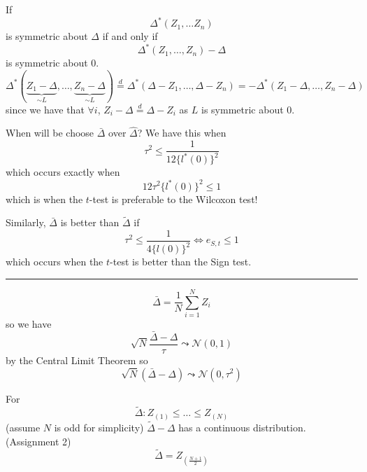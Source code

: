 \documentclass[a4paper,12pt]{amsart}
\newcommand{\sumiN}{\sum_{i=1}^N}
\begin{document}
If \[\Delta^*(Z_1, \ldots Z_n)\]
is symmetric about $\Delta$ if and only if
\[\Delta^*(Z_1, \ldots, Z_n) - \Delta \]
is symmetric about 0. 
\[\Delta^*(\underbrace{Z_1 - \Delta}_{\sim L}, \ldots, \underbrace{Z_n - \Delta}_{\sim L}) \overset{d}{=} \Delta^*(\Delta - Z_1, \ldots, \Delta - Z_n) =  - \Delta^*(Z_1 - \Delta, \ldots, Z_n - \Delta)\]
since we have that $\forall i$, $Z_i - \Delta \overset{d}{=} \Delta - Z_i$ as $L$ is symmetric about 0.

When will be choose $\bar{\Delta}$ over $\widehat{\Delta}$?
We have this when 
\[\tau^2 \leq \frac{1}{12 \{l^*(0)\}^2}\]
which occurs exactly when 
\[12 \tau^2 \{l^*(0)\}^2 \leq 1\]
which is when the $t$-test is preferable to the Wilcoxon test!


Similarly, $\bar{\Delta}$ is better than $\tilde{\Delta}$ if
\[\tau^2 \leq \frac{1}{4 \{l(0)\}^2} \Leftrightarrow e_{S,t} \leq 1\]
which occurs when the $t$-test is better than the Sign test.

\bigskip \hrule \bigskip

\[\bar{\Delta} = \frac{1}{N}\sumiN Z_i\]
so we have
\[\sqrt{N} \frac{\bar{\Delta} - \Delta}{\tau} \leadsto \mathcal{N}(0,1)\]
by the Central Limit Theorem so 
\[\sqrt{N}(\bar{\Delta} - \Delta) \leadsto \mathcal{N}(0,\tau^2)\]

For 
\[\tilde{\Delta}: Z_{(1)} \leq \ldots \leq Z_{(N)}\]
(assume $N$ is odd for simplicity)
$\tilde{\Delta} - \Delta$ has a continuous distribution. (Assignment 2)
\[\tilde{\Delta} = Z_{\left(\frac{N+1}{2}\right)}\]
\end{document}
